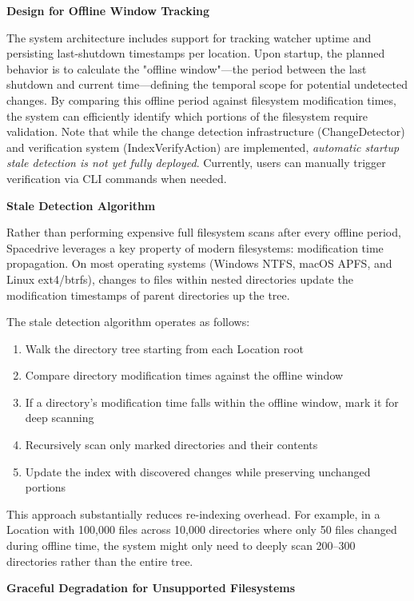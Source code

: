 \documentclass[sigconf]{acmart}
\begin{document}
\textbf{Design for Offline Window Tracking}

The system architecture includes support for tracking watcher uptime and persisting last-shutdown timestamps per location. Upon startup, the planned behavior is to calculate the "offline window"---the period between the last shutdown and current time---defining the temporal scope for potential undetected changes. By comparing this offline period against filesystem modification times, the system can efficiently identify which portions of the filesystem require validation. Note that while the change detection infrastructure (ChangeDetector) and verification system (IndexVerifyAction) are implemented, \textit{automatic startup stale detection is not yet fully deployed}. Currently, users can manually trigger verification via CLI commands when needed.

\textbf{Stale Detection Algorithm}

Rather than performing expensive full filesystem scans after every offline period, Spacedrive leverages a key property of modern filesystems: modification time propagation. On most operating systems (Windows NTFS, macOS APFS, and Linux ext4/btrfs), changes to files within nested directories update the modification timestamps of parent directories up the tree.

The stale detection algorithm operates as follows:
\begin{enumerate}[noitemsep, topsep=0pt]
\item Walk the directory tree starting from each Location root
\item Compare directory modification times against the offline window
\item If a directory's modification time falls within the offline window, mark it for deep scanning
\item Recursively scan only marked directories and their contents
\item Update the index with discovered changes while preserving unchanged portions
\end{enumerate}

This approach substantially reduces re-indexing overhead. For example, in a Location with 100,000 files across 10,000 directories where only 50 files changed during offline time, the system might only need to deeply scan 200–300 directories rather than the entire tree.

\textbf{Graceful Degradation for Unsupported Filesystems}
\end{document}
